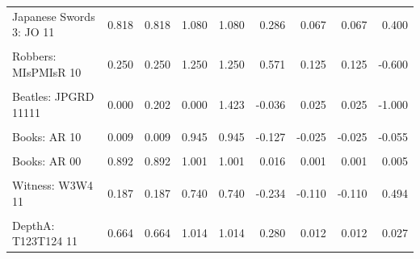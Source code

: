 \documentclass[
  10pt,
]{scrartcl}
\begin{document}
\begin{table}[H]
{\begin{tabular}[t]{lrrrrrrrr}
Japanese Swords 3: JO 11 & 0.818 & 0.818 & 1.080 & 1.080 & 0.286 & 0.067 & 0.067 & 0.400\\
\cellcolor{gray!6}{Robbers: MIsPMIsR 11} & \cellcolor{gray!6}{0.600} & \cellcolor{gray!6}{0.600} & \cellcolor{gray!6}{0.937} & \cellcolor{gray!6}{0.937} & \cellcolor{gray!6}{-0.143} & \cellcolor{gray!6}{-0.050} & \cellcolor{gray!6}{-0.050} & \cellcolor{gray!6}{0.600}\\
Robbers: MIsPMIsR 10 & 0.250 & 0.250 & 1.250 & 1.250 & 0.571 & 0.125 & 0.125 & -0.600\\
\cellcolor{gray!6}{Robbers: MIsPMIsR 01} & \cellcolor{gray!6}{0.250} & \cellcolor{gray!6}{0.250} & \cellcolor{gray!6}{1.250} & \cellcolor{gray!6}{1.250} & \cellcolor{gray!6}{0.571} & \cellcolor{gray!6}{0.125} & \cellcolor{gray!6}{0.125} & \cellcolor{gray!6}{-0.600}\\
Beatles: JPGRD 11111 & 0.000 & 0.202 & 0.000 & 1.423 & -0.036 & 0.025 & 0.025 & -1.000\\
\cellcolor{gray!6}{Books: AR 11} & \cellcolor{gray!6}{0.014} & \cellcolor{gray!6}{0.014} & \cellcolor{gray!6}{1.493} & \cellcolor{gray!6}{1.493} & \cellcolor{gray!6}{0.212} & \cellcolor{gray!6}{0.027} & \cellcolor{gray!6}{0.027} & \cellcolor{gray!6}{0.055}\\
Books: AR 10 & 0.009 & 0.009 & 0.945 & 0.945 & -0.127 & -0.025 & -0.025 & -0.055\\
\cellcolor{gray!6}{Books: AR 01} & \cellcolor{gray!6}{0.100} & \cellcolor{gray!6}{0.100} & \cellcolor{gray!6}{0.995} & \cellcolor{gray!6}{0.995} & \cellcolor{gray!6}{-0.101} & \cellcolor{gray!6}{-0.003} & \cellcolor{gray!6}{-0.003} & \cellcolor{gray!6}{-0.005}\\
Books: AR 00 & 0.892 & 0.892 & 1.001 & 1.001 & 0.016 & 0.001 & 0.001 & 0.005\\
\cellcolor{gray!6}{Witness: W1W2 11} & \cellcolor{gray!6}{0.451} & \cellcolor{gray!6}{0.451} & \cellcolor{gray!6}{3.551} & \cellcolor{gray!6}{3.551} & \cellcolor{gray!6}{0.771} & \cellcolor{gray!6}{0.446} & \cellcolor{gray!6}{0.446} & \cellcolor{gray!6}{0.729}\\
Witness: W3W4 11 & 0.187 & 0.187 & 0.740 & 0.740 & -0.234 & -0.110 & -0.110 & 0.494\\
\cellcolor{gray!6}{Witness: W4W5 11} & \cellcolor{gray!6}{0.365} & \cellcolor{gray!6}{0.365} & \cellcolor{gray!6}{1.260} & \cellcolor{gray!6}{1.260} & \cellcolor{gray!6}{0.218} & \cellcolor{gray!6}{0.110} & \cellcolor{gray!6}{0.110} & \cellcolor{gray!6}{0.602}\\
DepthA: T123T124 11 & 0.664 & 0.664 & 1.014 & 1.014 & 0.280 & 0.012 & 0.012 & 0.027\\

\end{tabular}}
\end{table}
\end{document}
